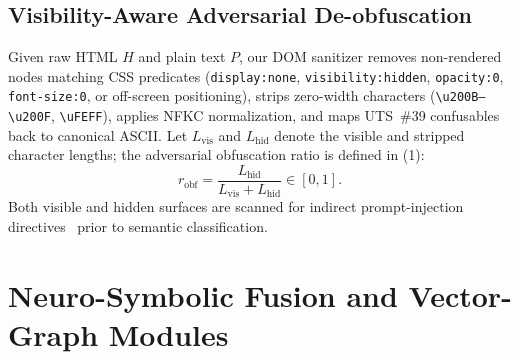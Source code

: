 \documentclass[conference]{IEEEtran}
\begin{document}
\subsection{Visibility-Aware Adversarial De-obfuscation}
Given raw HTML $H$ and plain text $P$, our DOM sanitizer removes non-rendered nodes matching CSS predicates (\texttt{display:none}, \texttt{visibility:hidden}, \texttt{opacity:0}, \texttt{font-size:0}, or off-screen positioning), strips zero-width characters (\texttt{\textbackslash u200B--\textbackslash u200F}, \texttt{\textbackslash uFEFF}), applies NFKC normalization, and maps UTS~\#39 confusables~\cite{unicode2024uts39} back to canonical ASCII. Let $L_{\text{vis}}$ and $L_{\text{hid}}$ denote the visible and stripped character lengths; the adversarial obfuscation ratio is defined in (1):
\begin{equation}
    r_{\text{obf}} = \frac{L_{\text{hid}}}{L_{\text{vis}} + L_{\text{hid}}} \in [0, 1].
\end{equation}
Both visible and hidden surfaces are scanned for indirect prompt-injection directives~\cite{greshake2023indirect} prior to semantic classification.

\section{Neuro-Symbolic Fusion and Vector-Graph Modules}
\end{document}
